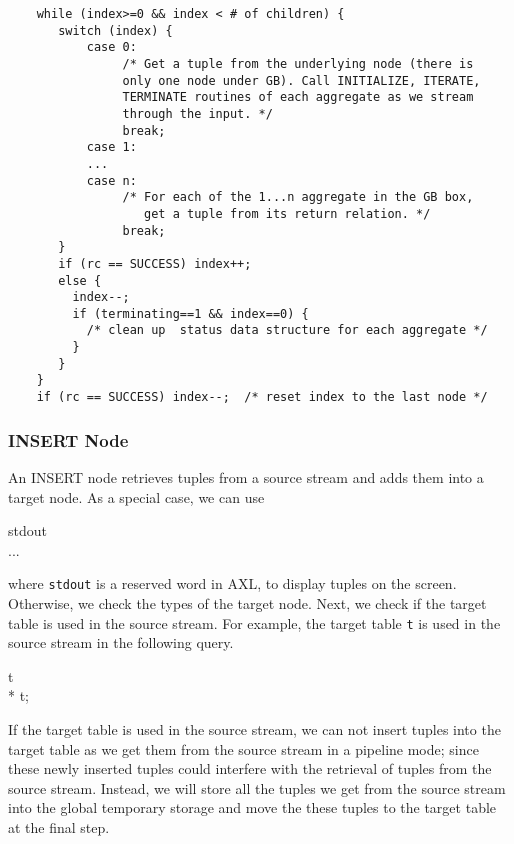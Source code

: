 {
\renewcommand{\baselinestretch}{1}
\begin{verbatim}
    while (index>=0 && index < # of children) {
       switch (index) {
           case 0:
                /* Get a tuple from the underlying node (there is 
                only one node under GB). Call INITIALIZE, ITERATE, 
                TERMINATE routines of each aggregate as we stream
                through the input. */
                break;
           case 1:
           ...
           case n:
                /* For each of the 1...n aggregate in the GB box, 
                   get a tuple from its return relation. */
                break;                    
       }
       if (rc == SUCCESS) index++;
       else {
         index--;
         if (terminating==1 && index==0) {
           /* clean up  status data structure for each aggregate */
         }
       }
    }     
    if (rc == SUCCESS) index--;  /* reset index to the last node */
\end{verbatim}
}

\subsubsection*{INSERT Node}
An INSERT node retrieves tuples from a source stream and adds them
into a target node. As a special case, we can use

\begin{codedisplay}
 stdout\\
 ...
\end{codedisplay}
where {\tt stdout} is a reserved word in AXL, to display tuples on the
screen. Otherwise, we check the types of the target node. Next, we
check if the target table is used in the source stream. For example,
the target table {\tt t} is used in the source stream in the following
query.

\begin{codedisplay}
 t\\
 *  t;
\end{codedisplay}

If the target table is used in the source stream, we can not insert
tuples into the target table as we get them from the source stream in
a pipeline mode; since these newly inserted tuples could interfere
with the retrieval of tuples from the source stream.  Instead, we will
store all the tuples we get from the source stream into the global
temporary storage and move the these tuples to the target table at the
final step.

